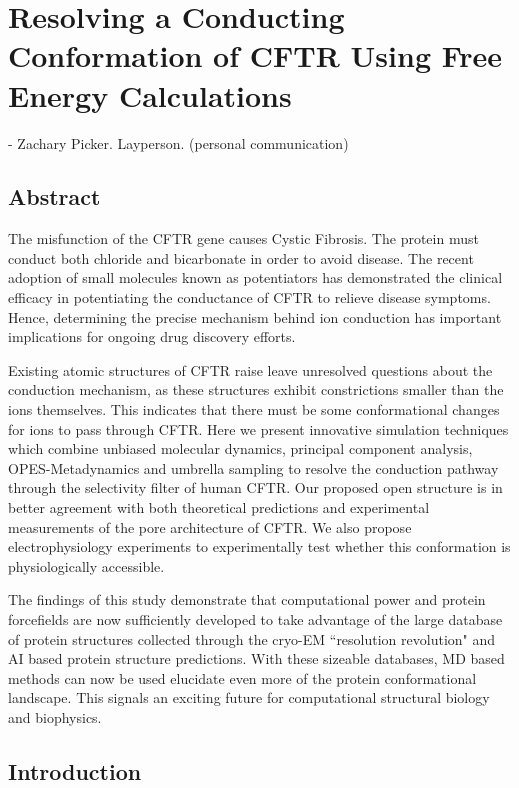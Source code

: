 \chapter{Resolving a Conducting Conformation of CFTR Using Free Energy Calculations}
\label{chap:opening}
\setcounter{figure}{0}
\renewcommand{\thefigure}{\arabic{chapter}.\arabic{figure}}
 {- Zachary Picker. Layperson. (personal communication)}


\section*{\centering Abstract} 
The misfunction of the CFTR gene causes Cystic Fibrosis. The protein must conduct both chloride and bicarbonate in order to avoid disease. The recent adoption of small molecules known as potentiators has demonstrated the clinical efficacy in potentiating the conductance of CFTR to relieve disease symptoms. Hence, determining the precise mechanism behind ion conduction has important implications for ongoing drug discovery efforts.

Existing atomic structures of CFTR raise leave unresolved questions about the conduction mechanism, as these structures exhibit constrictions smaller than the ions themselves. This indicates that there must be some conformational changes for ions to pass through CFTR. Here we present innovative simulation techniques which combine unbiased molecular dynamics, principal component analysis, OPES-Metadynamics and umbrella sampling to resolve the conduction pathway through the selectivity filter of human CFTR. Our proposed open structure is in better agreement with both theoretical predictions and experimental measurements of the pore architecture of CFTR. We also propose electrophysiology experiments to experimentally test whether this conformation is physiologically accessible.  

The findings of this study demonstrate that computational power and protein forcefields are now sufficiently developed to take advantage of the large database of protein structures collected through the cryo-EM ``resolution revolution" and AI based protein structure predictions. With these sizeable databases, MD based methods can now be used elucidate even more of the protein conformational landscape. This signals an exciting future for computational structural biology and biophysics.


\section{Introduction}

